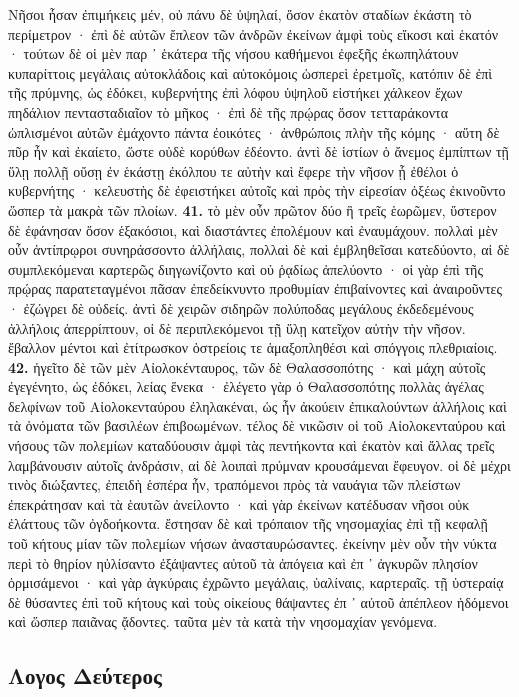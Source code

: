 \documentclass[a4paper, 11pt, oneside, polutonikogreek, german]{article}
\begin{document}
Νῆσοι ἦσαν ἐπιμήκεις μέν, οὐ πάνυ δὲ ὑψηλαί, ὅσον ἑκατὸν σταδίων ἑκάστη τὸ περίμετρον · ἐπὶ δὲ αὐτῶν ἔπλεον τῶν ἀνδρῶν ἐκείνων ἀμφὶ τοὺς εἴκοσι καὶ ἑκατόν · τούτων δὲ οἱ μὲν παρ ᾽ ἑκάτερα τῆς νήσου καθήμενοι ἐφεξῆς ἐκωπηλάτουν κυπαρίττοις μεγάλαις αὐτοκλάδοις καὶ αὐτοκόμοις ὡσπερεὶ ἐρετμοῖς, κατόπιν δὲ ἐπὶ τῆς πρύμνης, ὡς ἐδόκει, κυβερνήτης ἐπὶ λόφου ὑψηλοῦ εἱστήκει χάλκεον ἔχων πηδάλιον πεντασταδιαῖον τὸ μῆκος · ἐπὶ δὲ τῆς πρῴρας ὅσον τετταράκοντα ὡπλισμένοι αὐτῶν ἐμάχοντο πάντα ἐοικότες · ἀνθρώποις πλὴν τῆς κόμης · αὕτη δὲ πῦρ ἦν καὶ ἐκαίετο, ὥστε οὐδὲ κορύθων ἐδέοντο. ἀντὶ δὲ ἱστίων ὁ ἄνεμος ἐμπίπτων τῇ ὕλῃ πολλῇ οὔσῃ ἐν ἑκάστῃ ἐκόλπου τε αὐτὴν καὶ ἔφερε τὴν νῆσον ᾗ ἐθέλοι ὁ κυβερνήτης · κελευστὴς δὲ ἐφειστήκει αὐτοῖς καὶ πρὸς τὴν εἰρεσίαν ὀξέως ἐκινοῦντο ὥσπερ τὰ μακρὰ τῶν πλοίων. \textbf{41.} τὸ μὲν οὖν πρῶτον δύο ἢ τρεῖς ἑωρῶμεν, ὕστερον δὲ ἐφάνησαν ὅσον ἑξακόσιοι, καὶ διαστάντες ἐπολέμουν καὶ ἐναυμάχουν. πολλαὶ μὲν οὖν ἀντίπρῳροι συνηράσσοντο ἀλλήλαις, πολλαὶ δὲ καὶ ἐμβληθεῖσαι κατεδύοντο, αἱ δὲ συμπλεκόμεναι καρτερῶς διηγωνίζοντο καὶ οὐ ῥᾳδίως ἀπελύοντο · οἱ γὰρ ἐπὶ τῆς πρῴρας παρατεταγμένοι πᾶσαν ἐπεδείκνυντο προθυμίαν ἐπιβαίνοντες καὶ ἀναιροῦντες · ἐζώγρει δὲ οὐδείς. ἀντὶ δὲ χειρῶν σιδηρῶν πολύποδας μεγάλους ἐκδεδεμένους ἀλλήλοις ἀπερρίπτουν, οἱ δὲ περιπλεκόμενοι τῇ ὕλῃ κατεῖχον αὐτὴν τὴν νῆσον. ἔβαλλον μέντοι καὶ ἐτίτρωσκον ὀστρείοις τε ἁμαξοπληθέσι καὶ σπόγγοις πλεθριαίοις. \textbf{42.} ἡγεῖτο δὲ τῶν μὲν Αἰολοκένταυρος, τῶν δὲ Θαλασσοπότης · καὶ μάχη αὐτοῖς ἐγεγένητο, ὡς ἐδόκει, λείας ἕνεκα · ἐλέγετο γὰρ ὁ Θαλασσοπότης πολλὰς ἀγέλας δελφίνων τοῦ Αἰολοκενταύρου ἐληλακέναι, ὡς ἦν ἀκούειν ἐπικαλούντων ἀλλήλοις καὶ τὰ ὀνόματα τῶν βασιλέων ἐπιβοωμένων. τέλος δὲ νικῶσιν οἱ τοῦ Αἰολοκενταύρου καὶ νήσους τῶν πολεμίων καταδύουσιν ἀμφὶ τὰς πεντήκοντα καὶ ἑκατὸν καὶ ἄλλας τρεῖς λαμβάνουσιν αὐτοῖς ἀνδράσιν, αἱ δὲ λοιπαὶ πρύμναν κρουσάμεναι ἔφευγον. οἱ δὲ μέχρι τινὸς διώξαντες, ἐπειδὴ ἑσπέρα ἦν, τραπόμενοι πρὸς τὰ ναυάγια τῶν πλείστων ἐπεκράτησαν καὶ τὰ ἑαυτῶν ἀνείλοντο · καὶ γὰρ ἐκείνων κατέδυσαν νῆσοι οὐκ ἐλάττους τῶν ὀγδοήκοντα. ἔστησαν δὲ καὶ τρόπαιον τῆς νησομαχίας ἐπὶ τῇ κεφαλῇ τοῦ κήτους μίαν τῶν πολεμίων νήσων ἀνασταυρώσαντες. ἐκείνην μὲν οὖν τὴν νύκτα περὶ τὸ θηρίον ηὐλίσαντο ἐξάψαντες αὐτοῦ τὰ ἀπόγεια καὶ ἐπ ᾽ ἀγκυρῶν πλησίον ὁρμισάμενοι · καὶ γὰρ ἀγκύραις ἐχρῶντο μεγάλαις, ὑαλίναις, καρτεραῖς. τῇ ὑστεραίᾳ δὲ θύσαντες ἐπὶ τοῦ κήτους καὶ τοὺς οἰκείους θάψαντες ἐπ ᾽ αὐτοῦ ἀπέπλεον ἡδόμενοι καὶ ὥσπερ παιᾶνας ᾄδοντες. ταῦτα μὲν τὰ κατὰ τὴν νησομαχίαν γενόμενα.
\clearpage
\begin{center}
\section{Λογος Δεύτερος}
\end{center}
\end{document}
